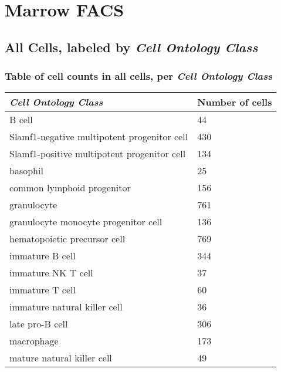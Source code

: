 \clearpage
\section{Marrow FACS}

\subsection{All Cells, labeled by \emph{Cell Ontology Class}}
\subsubsection{Table of cell counts in all cells, per \emph{Cell Ontology Class}}\begin{table}[h]
\centering
\label{my-label}
\begin{tabular}{@{}ll@{}}
\toprule

\emph{Cell Ontology Class}& Number of cells \\ \midrule
B cell & 44 \\

Slamf1-negative multipotent progenitor cell & 430 \\

Slamf1-positive multipotent progenitor cell & 134 \\

basophil & 25 \\

common lymphoid progenitor & 156 \\

granulocyte & 761 \\

granulocyte monocyte progenitor cell & 136 \\

hematopoietic precursor cell & 769 \\

immature B cell & 344 \\

immature NK T cell & 37 \\

immature T cell & 60 \\

immature natural killer cell & 36 \\

late pro-B cell & 306 \\

macrophage & 173 \\

mature natural killer cell & 49 \\


\end{tabular}
\end{table}
